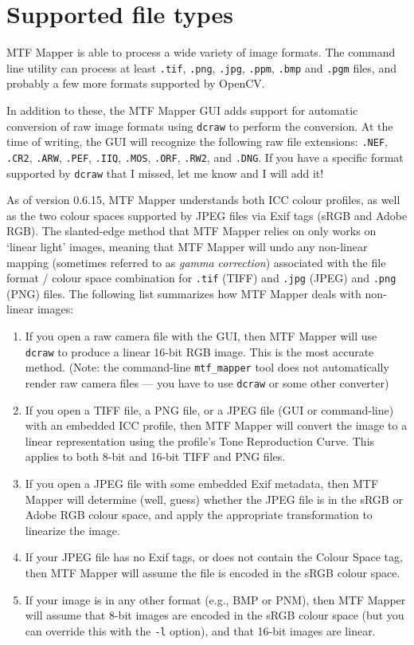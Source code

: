 \documentclass[a4paper]{article}
\begin{document}
\newpage

\section{Supported file types}
MTF Mapper is able to process a wide variety of image formats. The command
line utility can process at least \texttt{.tif}, \texttt{.png}, \texttt{.jpg},
\texttt{.ppm}, \texttt{.bmp} and \texttt{.pgm} files, and probably a few more formats
supported by OpenCV.

In addition to these, the MTF Mapper GUI adds support for automatic conversion of raw image
formats using \texttt{dcraw} to perform the conversion. At the time of
writing, the GUI will recognize the following raw file extensions:
\texttt{.NEF}, \texttt{.CR2}, \texttt{.ARW}, \texttt{.PEF}, \texttt{.IIQ},
\texttt{.MOS}, \texttt{.ORF}, \texttt{.RW2}, and \texttt{.DNG}. If you have
a specific format supported by \texttt{dcraw} that I missed, let me know and
I will add it!

As of version 0.6.15, MTF Mapper understands both ICC colour profiles, as
well as the two colour spaces supported by JPEG files via Exif tags (sRGB
and Adobe RGB). The slanted-edge method that MTF Mapper relies on only
works on `linear light' images, meaning that MTF Mapper will undo any
non-linear mapping (sometimes referred to as \emph{gamma correction}) associated with
the file format / colour space combination for \texttt{.tif} (TIFF) and
\texttt{.jpg} (JPEG) and \texttt{.png} (PNG) files. 
The following list summarizes how MTF Mapper deals with non-linear images:
\begin{enumerate}
\item
If you open a raw camera file with the GUI, then MTF Mapper will use
\texttt{dcraw} to produce a linear 16-bit RGB image. This is the most
accurate method. (Note: the command-line \texttt{mtf\_mapper} tool does not
automatically render raw camera files --- you have to use \texttt{dcraw} or
some other converter)
\item
If you open a TIFF file, a PNG file, or a JPEG file  (GUI or command-line)
with an embedded ICC profile, then MTF Mapper will convert the image to a
linear representation using the profile's Tone Reproduction Curve.  This
applies to both 8-bit and 16-bit TIFF and PNG files.
\item
If you open a JPEG file with some embedded Exif metadata, then MTF Mapper
will determine (well, guess) whether the JPEG file is in the sRGB or Adobe
RGB colour space, and apply the appropriate transformation to linearize 
the image.
\item
If your JPEG file has no Exif tags, or does not contain the Colour Space
tag, then MTF Mapper will assume the file is encoded in the sRGB colour space.
\item
If your image is in any other format (e.g., BMP or PNM), then MTF Mapper will 
assume that 8-bit images are encoded in the sRGB colour space (but you can
override this with the \texttt{-l} option), and that
16-bit images are linear.
\end{enumerate}
\end{document}
